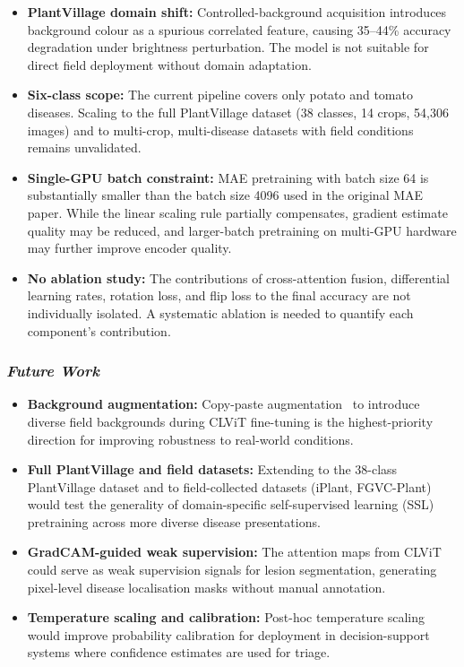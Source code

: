 \documentclass[conference]{IEEEtran}
\begin{document}
\begin{itemize}
    \item \textbf{PlantVillage domain shift:} Controlled-background acquisition introduces background colour as a spurious correlated feature, causing 35--44\% accuracy degradation under brightness perturbation. The model is not suitable for direct field deployment without domain adaptation.

    \item \textbf{Six-class scope:} The current pipeline covers only potato and tomato diseases. Scaling to the full PlantVillage dataset (38 classes, 14 crops, 54,306 images) and to multi-crop, multi-disease datasets with field conditions remains unvalidated.

    \item \textbf{Single-GPU batch constraint:} MAE pretraining with batch size 64 is substantially smaller than the batch size 4096 used in the original MAE paper. While the linear scaling rule partially compensates, gradient estimate quality may be reduced, and larger-batch pretraining on multi-GPU hardware may further improve encoder quality.

    \item \textbf{No ablation study:} The contributions of cross-attention fusion, differential learning rates, rotation loss, and flip loss to the final accuracy are not individually isolated. A systematic ablation is needed to quantify each component's contribution.
\end{itemize}

\subsubsection{\textit{Future Work}}

\begin{itemize}
    \item \textbf{Background augmentation:} Copy-paste augmentation~\cite{13} to introduce diverse field backgrounds during CLViT fine-tuning is the highest-priority direction for improving robustness to real-world conditions.

    \item \textbf{Full PlantVillage and field datasets:} Extending to the 38-class PlantVillage dataset and to field-collected datasets (iPlant, FGVC-Plant) would test the generality of domain-specific self-supervised learning (SSL) pretraining across more diverse disease presentations.

    \item \textbf{GradCAM-guided weak supervision:} The attention maps from CLViT could serve as weak supervision signals for lesion segmentation, generating pixel-level disease localisation masks without manual annotation.

    \item \textbf{Temperature scaling and calibration:} Post-hoc temperature scaling would improve probability calibration for deployment in decision-support systems where confidence estimates are used for triage.
\end{itemize}
\end{document}
